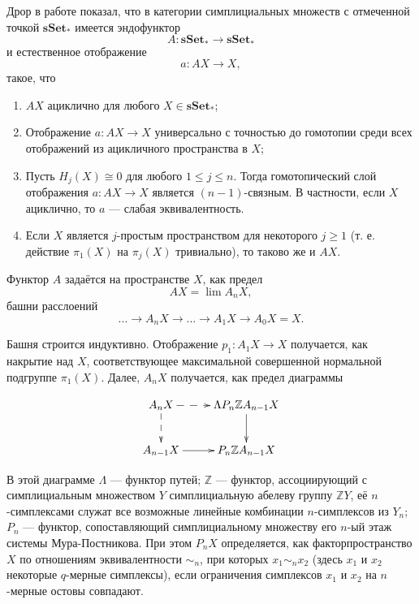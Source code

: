 \documentclass[14pt, dvipsnames, twoside]{extarticle}
\theoremstyle{definition}
\theoremstyle{remark}
\begin{document}
Дрор в работе \cite{Dror} показал, что в категории симплициальных множеств с отмеченной точкой $\mathbf{sSet}_\ast$ имеется эндофунктор $$A: \mathbf{sSet}_\ast \to \mathbf{sSet}_\ast$$ и естественное отображение $$a: AX\to X,$$ такое, что 

\begin{enumerate} 

\item $AX$ ациклично для любого $X\in\mathbf{sSet}_\ast$;

\item Отображение $a: AX\to X$ универсально с точностью до гомотопии среди всех отображений из ацикличного пространства в $X$;

\item Пусть $H_j(X)\cong 0$ для любого $1\leqslant j \leqslant n$. Тогда гомотопический слой отображения $a: AX\to X$ является $(n-1)$-связным. В частности, если $X$ ациклично, то $a$ --- слабая эквивалентность. \label{DrorProperty}

\item Если $X$ является $j$-простым пространством для некоторого $j\geqslant 1$ (т. е. действие $\pi_1(X)$ на $\pi_j(X)$ тривиально), то таково же и $AX$. 

\end{enumerate}

Функтор $A$ задаётся на пространстве $X$, как предел $$AX = \lim A_n X,$$ башни расслоений $$...\to A_n X\to ...\to A_1X \to A_0X = X.$$

Башня строится индуктивно. Отображение $p_1 : A_1X\to X$ получается, как накрытие над $X$, соответствующее максимальной совершенной нормальной подгруппе $\pi_1(X)$. Далее, $A_nX$ получается, как предел диаграммы  

\begin{equation}\label{Dror}
\xymatrix{
    A_nX \ar@{-->}[r] \ar@{-->}[d] & \Lambda P_n \mathbb{Z} A_{n-1} X \ar[d] \\
    A_{n-1}X \ar[r]       & P_n\mathbb{Z}A_{n-1}X }
\end{equation}
    
 В этой диаграмме $\Lambda$ --- функтор путей; $\mathbb{Z}$ --- функтор, ассоциирующий с симплициальным множеством $Y$ симплициальную абелеву группу $\mathbb{Z}Y$, её $n$-симплексами служат все возможные линейные комбинации $n$-симплексов из $Y_n$; $P_n$ --- функтор, сопоставляющий симплициальному множеству его $n$-ый этаж системы Мура-Постникова. При этом $P_nX$ определяется, как факторпространство $X$ по отношениям эквивалентности $\sim_n$, при которых $x_1\sim_n x_2$ (здесь $x_1$ и $x_2$ некоторые $q$-мерные симплексы), если ограничения симплексов $x_1$ и $x_2$ на $n$-мерные остовы совпадают. 
 
\end{document}
